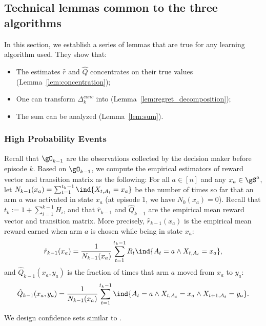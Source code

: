 \begin{subappendices}
\subsection{Technical lemmas common to the three algorithms}
\label{ssec:technical_lemmas}

In this section, we establish a series of lemmas that are true for any learning algorithm used. They show that:
\begin{itemize}
    \item The estimates $\hat{r}$ and $\hat{Q}$ concentrates on their true values (Lemma~\ref{lem:concentration});
    \item One can transform $\Delta^{conc}_k$ into  (Lemma~\ref{lem:regret_decomposition});
    \item The sum  can be analyzed (Lemma~\ref{lem:sum}).
\end{itemize}

\subsubsection{High Probability Events}

Recall that $\gO_{k-1}$ are the observations collected by the decision maker before episode $k$. Based on $\gO_{k-1}$, we compute the empirical estimators of reward vector and transition matrix as the following: For all $a\in[n]$ and any $x_a\in\gS^a$, let $N_{k-1}(x_a)=\sum_{t=1}^{t_{k}-1}\ind{X_{t,A_t}=x_a}$ be the number of times so far that an arm $a$ was activated in state $x_a$ (at episode $1$, we have ${N_0(x_a)=0}$).
Recall that $t_{k}{:=} 1 {+}\sum_{i=1}^{k-1}H_i$, and that $\hat{r}_{k-1}$ and $\hat{Q}_{k-1}$ are the empirical mean reward vector and transition matrix. More precisely, $\hat{r}_{k-1}(x_a)$ is the empirical mean reward earned when arm $a$ is chosen while being in state $x_a$:
\begin{align*}
    \hat{r}_{k-1}(x_a) = \frac{1}{N_{k-1}(x_a)}\sum_{t=1}^{t_{k}-1} R_t\ind{A_t=a \land X_{t,A_t}=x_a},
\end{align*}
and $\hat{Q}_{k-1}(x_a,y_a)$ is the fraction of times that arm $a$ moved from $x_a$ to $y_a$:
\begin{align*}
    \hat{Q}_{k-1}(x_a,y_a) = \frac{1}{N_{k-1}(x_a)}\sum_{t=1}^{t_{k}-1} \ind{A_t=a \land X_{t,A_t}=x_a \land X_{t+1,A_t}=y_a}.
\end{align*}

We design confidence sets similar to \cite{jaksch2010near,bartlett2012regal}.


\end{subappendices}
